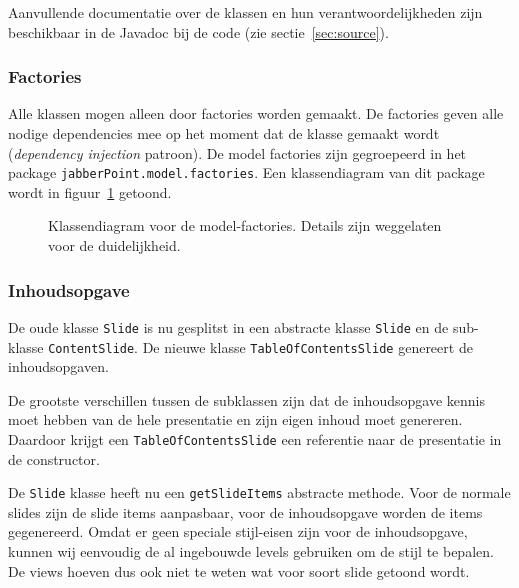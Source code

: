 \documentclass[a4paper]{article}
\newcommand{\code}[1]{\lstinline[columns=fixed]{#1}}
\newcommand{\diagram}[3][1.3]{
	\begin{figure}[!htb]
	 \caption{#3}
	 \label{diagram:#2}
	 \makebox[\textwidth][c]{\texttt{[image: Diagrams/\#2.pdf]}}%
	\end{figure}
}
\begin{document}
		Aanvullende documentatie over de klassen en hun verantwoordelijkheden zijn beschikbaar in de Javadoc bij de code (zie sectie~\ref{sec:source}).
		
		\subsubsection{Factories}\label{sec:model-factories}
			Alle klassen mogen alleen door factories worden gemaakt.
			De factories geven alle nodige dependencies mee op het moment dat de klasse gemaakt wordt (\textit{dependency injection} patroon).
			De model factories zijn gegroepeerd in het package \code{jabberPoint.model.factories}.
			Een klassendiagram van dit package wordt in figuur~\ref{diagram:model-factories} getoond.

			\diagram[1.2]{model-factories}{
				Klassendiagram voor de model-factories.
				Details zijn weggelaten voor de duidelijkheid.
			}

		\subsubsection{Inhoudsopgave}
			De oude klasse \code{Slide} is nu gesplitst in een abstracte klasse \code{Slide} en de sub-klasse \code{ContentSlide}.
			De nieuwe klasse \code{TableOfContentsSlide} genereert de inhoudsopgaven.

			De grootste verschillen tussen de subklassen zijn dat de inhoudsopgave kennis moet hebben van de hele presentatie en zijn eigen inhoud moet genereren.
			Daardoor krijgt een \code{TableOfContentsSlide} een referentie naar de presentatie in de constructor.

			De \code{Slide} klasse heeft nu een \code{getSlideItems} abstracte methode.
			Voor de normale slides zijn de slide items aanpasbaar, voor de inhoudsopgave worden de items gegenereerd.
			Omdat er geen speciale stijl-eisen zijn voor de inhoudsopgave, kunnen wij eenvoudig de al ingebouwde levels gebruiken om de stijl te bepalen.
			De views hoeven dus ook niet te weten wat voor soort slide getoond wordt.
\end{document}
